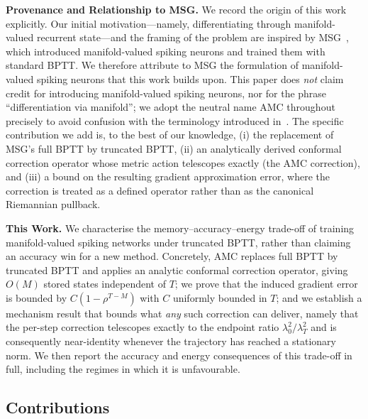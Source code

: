 \documentclass[a4paper,fleqn]{cas-dc}
\begin{document}
\textbf{Provenance and Relationship to MSG.} We record the origin of this work explicitly. Our initial motivation---namely, differentiating through manifold-valued recurrent state---and the framing of the problem are inspired by MSG~\citep{Sun24MSG}, which introduced manifold-valued spiking neurons and trained them with standard BPTT. We therefore attribute to MSG the formulation of manifold-valued spiking neurons that this work builds upon. This paper does \emph{not} claim credit for introducing manifold-valued spiking neurons, nor for the phrase ``differentiation via manifold''; we adopt the neutral name AMC throughout precisely to avoid confusion with the terminology introduced in~\citep{Sun24MSG}. The specific contribution we add is, to the best of our knowledge, (i) the replacement of MSG's full BPTT by truncated BPTT, (ii) an analytically derived conformal correction operator whose metric action telescopes exactly (the AMC correction), and (iii) a bound on the resulting gradient approximation error, where the correction is treated as a defined operator rather than as the canonical Riemannian pullback.

\textbf{This Work.} We characterise the memory--accuracy--energy trade-off of training manifold-valued spiking networks under truncated BPTT, rather than claiming an accuracy win for a new method. Concretely, AMC replaces full BPTT by truncated BPTT and applies an analytic conformal correction operator, giving $O(M)$ stored states independent of $T$; we prove that the induced gradient error is bounded by $C(1-\rho^{T-M})$ with $C$ uniformly bounded in $T$; and we establish a mechanism result that bounds what \emph{any} such correction can deliver, namely that the per-step correction telescopes exactly to the endpoint ratio $\lambda_0^2/\lambda_T^2$ and is consequently near-identity whenever the trajectory has reached a stationary norm. We then report the accuracy and energy consequences of this trade-off in full, including the regimes in which it is unfavourable.

\subsection{Contributions}
\end{document}
